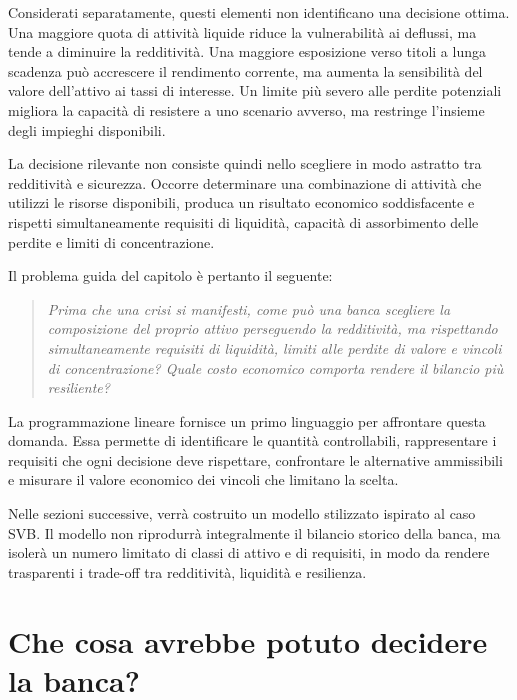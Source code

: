 Considerati separatamente, questi elementi non identificano una decisione
ottima. Una maggiore quota di attivit\`{a} liquide riduce la
vulnerabilit\`{a} ai deflussi, ma tende a diminuire la redditivit\`{a}.
Una maggiore esposizione verso titoli a lunga scadenza pu\`{o} accrescere
il rendimento corrente, ma aumenta la sensibilit\`{a} del valore
dell'attivo ai tassi di interesse. Un limite pi\`{u} severo alle perdite
potenziali migliora la capacit\`{a} di resistere a uno scenario avverso,
ma restringe l'insieme degli impieghi disponibili.

La decisione rilevante non consiste quindi nello scegliere in modo
astratto tra redditivit\`{a} e sicurezza. Occorre determinare una
combinazione di attivit\`{a} che utilizzi le risorse disponibili, produca
un risultato economico soddisfacente e rispetti simultaneamente requisiti
di liquidit\`{a}, capacit\`{a} di assorbimento delle perdite e limiti di
concentrazione.

Il problema guida del capitolo \`{e} pertanto il seguente:

\begin{quote}
\emph{Prima che una crisi si manifesti, come pu\`{o} una banca scegliere la
composizione del proprio attivo perseguendo la redditivit\`{a}, ma
rispettando simultaneamente requisiti di liquidit\`{a}, limiti alle
perdite di valore e vincoli di concentrazione? Quale costo economico
comporta rendere il bilancio pi\`{u} resiliente?}
\end{quote}

La programmazione lineare fornisce un primo linguaggio per affrontare
questa domanda. Essa permette di identificare le quantit\`{a}
controllabili, rappresentare i requisiti che ogni decisione deve
rispettare, confrontare le alternative ammissibili e misurare il valore
economico dei vincoli che limitano la scelta.

Nelle sezioni successive, verr\`{a} costruito un modello stilizzato
ispirato al caso SVB. Il modello non riprodurr\`{a} integralmente il
bilancio storico della banca, ma isoler\`{a} un numero limitato di classi
di attivo e di requisiti, in modo da rendere trasparenti i trade-off tra
redditivit\`{a}, liquidit\`{a} e resilienza.

\section{Che cosa avrebbe potuto decidere la banca?}

\label{sec:cap11-decisioni-banca}

